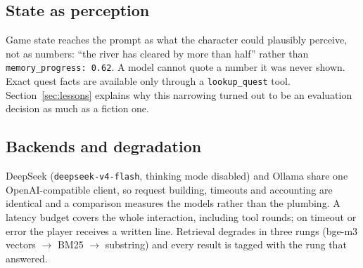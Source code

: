 \subsection{State as perception}

Game state reaches the prompt as what the character could plausibly perceive,
not as numbers: ``the river has cleared by more than half'' rather than
\texttt{memory\_progress: 0.62}. A model cannot quote a number it was never
shown. Exact quest facts are available only through a \texttt{lookup\_quest}
tool. Section~\ref{sec:lessons} explains why this narrowing turned out to be
an evaluation decision as much as a fiction one.

\subsection{Backends and degradation}

DeepSeek (\texttt{deepseek-v4-flash}, thinking mode disabled) and Ollama share
one OpenAI-compatible client, so request building, timeouts and accounting are
identical and a comparison measures the models rather than the plumbing. A
latency budget covers the whole interaction, including tool rounds; on timeout
or error the player receives a written line. Retrieval degrades in three rungs
(bge-m3 vectors $\rightarrow$ BM25 $\rightarrow$ substring) and every result
is tagged with the rung that answered.
